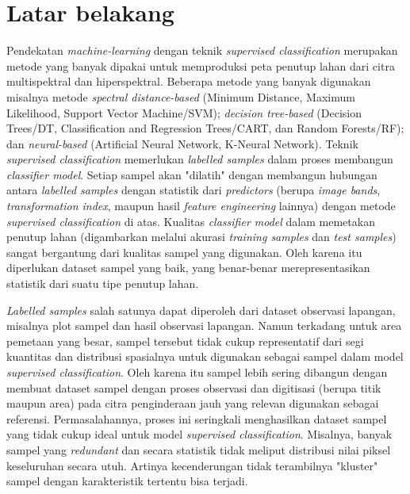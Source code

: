 \documentclass[a4paper,12pt]{article}
\begin{document}
\section{Latar belakang}
Pendekatan \textit{machine-learning} dengan teknik \textit{supervised classification} merupakan metode yang banyak dipakai untuk memproduksi peta penutup lahan dari citra multispektral dan hiperspektral. Beberapa metode yang banyak digunakan misalnya metode \textit{spectral distance-based} (Minimum Distance, Maximum Likelihood, Support Vector Machine/SVM); \textit{decision tree-based} (Decision Trees/DT, Classification and Regression Trees/CART, dan Random Forests/RF); dan \textit{neural-based} (Artificial Neural Network, K-Neural Network). Teknik \textit{supervised classification} memerlukan \textit{labelled samples} dalam proses membangun \textit{classifier model}. Setiap sampel akan "dilatih" dengan membangun hubungan antara \textit{labelled samples} dengan statistik dari \textit{predictors} (berupa \textit{image bands}, \textit{transformation index}, maupun hasil \textit{feature engineering} lainnya) dengan metode \textit{supervised classification} di atas. Kualitas \textit{classifier model} dalam memetakan penutup lahan (digambarkan melalui akurasi \textit{training samples} dan \textit{test samples}) sangat bergantung dari kualitas sampel yang digunakan. Oleh karena itu diperlukan dataset sampel yang baik, yang benar-benar merepresentasikan statistik dari suatu tipe penutup lahan.

\textit{Labelled samples} salah satunya dapat diperoleh dari dataset observasi lapangan, misalnya plot sampel dan hasil observasi lapangan. Namun terkadang untuk area pemetaan yang besar, sampel tersebut tidak cukup representatif dari segi kuantitas dan distribusi spasialnya untuk digunakan sebagai sampel dalam model \textit{supervised classification}. Oleh karena itu sampel lebih sering dibangun dengan membuat dataset sampel dengan proses observasi dan digitisasi (berupa titik maupun area) pada citra penginderaan jauh yang relevan digunakan sebagai referensi. Permasalahannya, proses ini seringkali menghasilkan dataset sampel yang tidak cukup ideal untuk model \textit{supervised classification}. Misalnya, banyak sampel yang \textit{redundant} dan secara statistik tidak meliput distribusi nilai piksel keseluruhan secara utuh. Artinya kecenderungan tidak terambilnya "kluster" sampel dengan karakteristik tertentu bisa terjadi.
\end{document}
